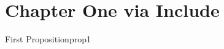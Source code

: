 \section{Chapter One via Include}
\label{sec:ch1}

\begin{prop}{First Proposition}{prop1}
\end{prop}
